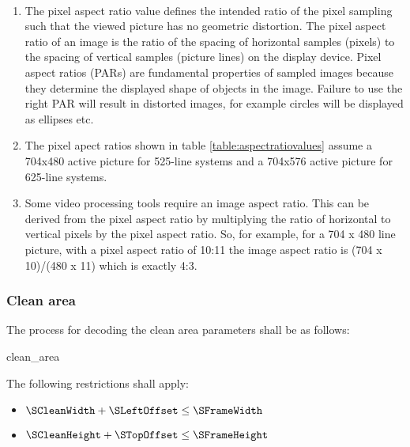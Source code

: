 \begin{informative}
 \\
\begin{enumerate}
\item The pixel aspect ratio value defines the intended ratio of the pixel 
sampling such that the viewed picture has no geometric distortion. The pixel aspect
 ratio of an image is the ratio of the spacing of horizontal samples 
(pixels) to the spacing of vertical samples (picture lines) on the display device. 
Pixel aspect ratios (PARs) are fundamental properties of sampled images because
 they determine the displayed shape of objects in the image. Failure to use the right
 PAR will result in distorted images, for example circles will be displayed as 
ellipses etc.   
\item The pixel apect ratios shown in table \ref{table:aspectratiovalues} assume
a 704x480 active picture for 525-line systems and a 704x576 active picture for 
625-line systems.
\item Some video processing tools require an image aspect ratio. This can be 
derived from the pixel aspect ratio by multiplying the ratio of horizontal to vertical 
pixels by the pixel aspect ratio. So, for example, for a 704 x 480 line picture, with 
a pixel aspect ratio of 10:11 the image aspect ratio is (704 x 10)/(480 x 11) which is
 exactly 4:3.
\end{enumerate}
\end{informative}

\subsubsection{Clean area}
\label{cleanarea}

The process for decoding the clean area parameters shall be as follows:

\begin{pseudo}{clean\_area}{\VideoParams}
\bsEND
\end{pseudo}

The following restrictions shall apply:

\begin{itemize}
\item $\SCleanWidth+\SLeftOffset
\leq \SFrameWidth$
\item $\SCleanHeight+\STopOffset
\leq \SFrameHeight$
\end{itemize}

